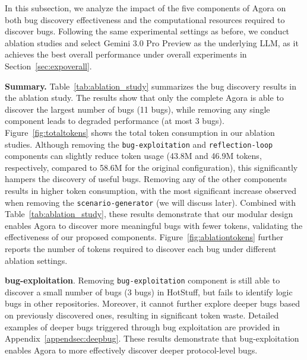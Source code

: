\documentclass{article}
\theoremstyle{plain}
\theoremstyle{definition}
\theoremstyle{remark}
\newcommand{\consensustester}{Agora\xspace}
\newcommand{\agenta}{Orchestrator\xspace}
\newcommand{\agentb}{Strategy\xspace}
\newcommand{\agentc}{TestGen\xspace}
\begin{document}




In this subsection, we analyze the impact of the five components of \consensustester on both bug discovery effectiveness and the computational resources required to discover bugs. Following the same experimental settings as before, we conduct ablation studies and select Gemini 3.0 Pro Preview as the underlying LLM, as it achieves the best overall performance under overall experiments in Section~\ref{sec:expoverall}.

\textbf{Summary.} Table~\ref{tab:ablation_study} summarizes the bug discovery results in the ablation study. The results show that only the complete \consensustester is able to discover the largest number of bugs (11 bugs), while removing any single component leads to degraded performance (at most 3 bugs). 
Figure~\ref{fig:totaltokens} shows the total token consumption in our ablation studies. Although removing the \texttt{bug-exploitation} and \texttt{reflection-loop} components can slightly reduce token usage (43.8M and 46.9M tokens, respectively, compared to 58.6M for the original configuration), this significantly hampers the discovery of useful bugs. Removing any of the other components results in higher token consumption, with the most significant increase observed when removing the \texttt{scenario-generator} (we will discuss later). Combined with Table~\ref{tab:ablation_study}, these results demonstrate that our modular design enables \consensustester to discover more meaningful bugs with fewer tokens, validating the effectiveness of our proposed components. Figure~\ref{fig:ablationtokens} further reports the number of tokens required to discover each bug under different ablation settings.

\textbf{bug-exploitation}. Removing \texttt{bug-exploitation} component is still able to discover a small number of bugs (3 bugs) in HotStuff, but fails to identify logic bugs in other repositories. Moreover, it cannot further explore deeper bugs based on previously discovered ones, resulting in significant token waste. Detailed examples of deeper bugs triggered through bug exploitation are provided in Appendix~\ref{appendsec:deepbug}. These results demonstrate that bug-exploitation enables \consensustester to more effectively discover deeper protocol-level bugs.
\end{document}
